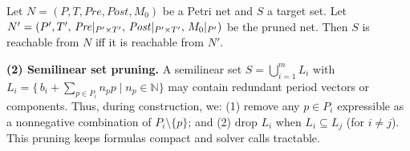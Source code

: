 
\begin{theorem}
	\label{thm:bidirectional-pruning}
	Let $N = (P, T, Pre, Post, M_0)$ be a Petri net and $S$ a target set.  
	Let $N' = (P',T',\,\mathit{Pre}|_{P'\times T'},\,\mathit{Post}|_{P'\times T'},\,M_0|_{P'})$ be the pruned net.  
	Then $S$ is reachable from $N$ iff it is reachable from $N'$.
\end{theorem}
%
%


\medskip
\noindent
\textbf{(2) Semilinear set pruning.}  
A semilinear set $S=\bigcup_{i=1}^m L_i$ with 
	$L_i=\{\,b_i+\sum_{p\in P_i}n_p p \mid n_p\in\mathbb N\}$ may contain redundant 
	period vectors or components.  
	Thus, during construction, we:
	(1) remove any $p\in P_i$ expressible as a nonnegative combination of $P_i\setminus\{p\}$; 
	and (2) drop $L_i$ when $L_i\subseteq L_j$ (for \(i \neq j\)).  
	This pruning keeps formulas compact and solver calls tractable.





